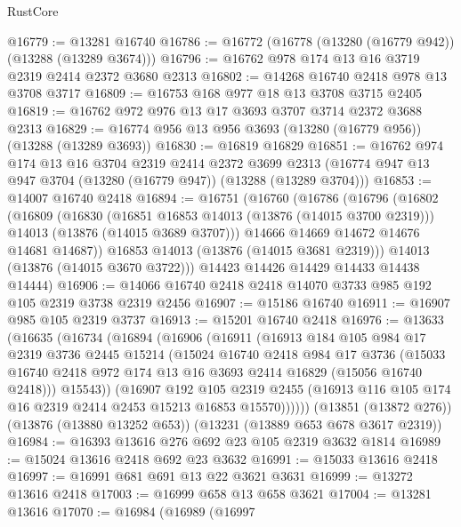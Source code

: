\begin{lexlean}{RustCore}
\begin{coremodule}
@16779 := @13281 @16740
@16786 := @16772 (@16778 (@13280 (@16779 @942)) (@13288 (@13289 @3674)))
@16796 := @16762 @978 @174 @13 @16 @3719 @2319 @2414 @2372 @3680 @2313
@16802 := @14268 @16740 @2418 @978 @13 @3708 @3717
@16809 := @16753 @168 @977 @18 @13 @3708 @3715 @2405
@16819 := @16762 @972 @976 @13 @17 @3693 @3707 @3714 @2372 @3688 @2313
@16829 := @16774 @956 @13 @956 @3693 (@13280 (@16779 @956)) (@13288 (@13289 @3693))
@16830 := @16819 @16829
@16851 := @16762
    @974
    @174
    @13
    @16
    @3704
    @2319
    @2414
    @2372
    @3699
    @2313
    (@16774 @947 @13 @947 @3704 (@13280 (@16779 @947)) (@13288 (@13289 @3704)))
@16853 := @14007 @16740 @2418
@16894 := @16751
    (@16760
      (@16786
        (@16796
          (@16802
            (@16809
              (@16830
                (@16851 @16853 @14013 (@13876 (@14015 @3700 @2319)))
                @14013
                (@13876 (@14015 @3689 @3707)))
              @14666
              @14669
              @14672
              @14676
              @14681
              @14687))
          @16853
          @14013
          (@13876 (@14015 @3681 @2319)))
        @14013
        (@13876 (@14015 @3670 @3722)))
      @14423
      @14426
      @14429
      @14433
      @14438
      @14444)
@16906 := @14066 @16740 @2418 @2418 @14070 @3733 @985 @192 @105 @2319 @3738 @2319 @2456
@16907 := @15186 @16740
@16911 := @16907 @985 @105 @2319 @3737
@16913 := @15201 @16740 @2418
@16976 := @13633
    (@16635
      (@16734
        (@16894
          (@16906
            (@16911
              (@16913
                @184
                @105
                @984
                @17
                @2319
                @3736
                @2445
                @15214
                (@15024
                  @16740
                  @2418
                  @984
                  @17
                  @3736
                  (@15033 @16740 @2418 @972 @174 @13 @16 @3693 @2414 @16829 (@15056 @16740 @2418)))
                @15543))
            (@16907
              @192
              @105
              @2319
              @2455
              (@16913 @116 @105 @174 @16 @2319 @2414 @2453 @15213 @16853 @15570))))))
    (@13851 (@13872 @276))
    (@13876 (@13880 @13252 @653))
    (@13231 (@13889 @653 @678 @3617 @2319))
@16984 := @16393 @13616 @276 @692 @23 @105 @2319 @3632 @1814
@16989 := @15024 @13616 @2418 @692 @23 @3632
@16991 := @15033 @13616 @2418
@16997 := @16991 @681 @691 @13 @22 @3621 @3631
@16999 := @13272 @13616 @2418
@17003 := @16999 @658 @13 @658 @3621
@17004 := @13281 @13616
@17070 := @16984
    (@16989
      (@16997

\end{coremodule}
\end{lexlean}
